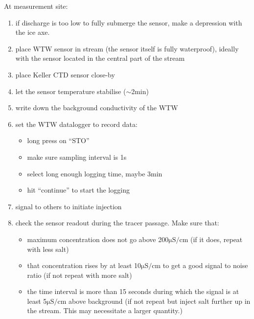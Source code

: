 \documentclass[DIV=15,halfparskip,11pt,headinclude]{scrartcl}
\begin{document}
At measurement site:
\begin{enumerate}
\item if discharge is too low to fully submerge the sensor, make a
depression with the ice axe.
\item place WTW sensor in stream (the sensor itself is fully waterproof),
  ideally with the sensor located in the central part of the stream
\item place Keller CTD sensor close-by
\item let the sensor temperature stabilise ($\sim$2min)
\item write down the background conductivity of the WTW
\item set the WTW datalogger to record data:
\begin{itemize}
\item long press on ``STO''
\item make sure sampling interval is 1s
\item select long enough logging time, maybe 3min
\item hit ``continue'' to start the logging
\end{itemize}
\item signal to others to initiate injection
\item check the sensor readout during the tracer passage.  Make sure
  that:
\begin{itemize}
\item maximum concentration does not go above 200$\mathrm{\mu S/cm}$
  (if it does, repeat with less salt)
\item that concentration rises by at least 10$\mathrm{\mu S/cm}$ to get
  a good signal to noise ratio (if not repeat with more salt)
\item the time interval is more than 15 seconds during which the
  signal is at least 5$\mathrm{\mu S/cm}$ above background (if not
  repeat but inject salt further up in the stream.  This may
  necessitate a larger quantity.)
\end{itemize}
\end{enumerate}
\end{document}
